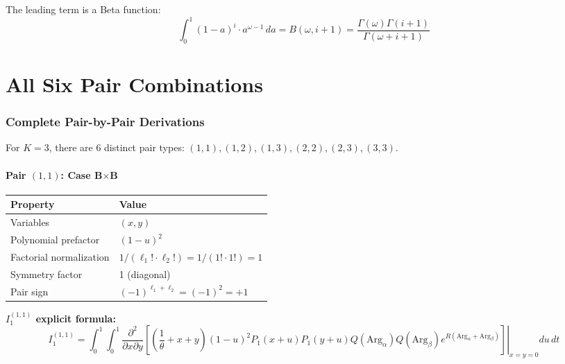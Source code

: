 \documentclass[11pt]{article}
\begin{document}
The leading term is a Beta function:
\begin{equation}
\int_0^1 (1-a)^i \cdot a^{\omega-1} \, da = B(\omega, i+1) = \frac{\Gamma(\omega)\Gamma(i+1)}{\Gamma(\omega+i+1)}
\end{equation}


\part{All Six Pair Combinations}

\section{Complete Pair-by-Pair Derivations}
\label{sec:pairs}

For $K=3$, there are 6 distinct pair types: $(1,1), (1,2), (1,3), (2,2), (2,3), (3,3)$.

\subsection{Pair $(1,1)$: Case B$\times$B}

\begin{center}
\begin{tabular}{ll}
\toprule
Property & Value \\
\midrule
Variables & $(x, y)$ \\
Polynomial prefactor & $(1-u)^2$ \\
Factorial normalization & $1/(\ell_1! \cdot \ell_2!) = 1/(1! \cdot 1!) = 1$ \\
Symmetry factor & 1 (diagonal) \\
Pair sign & $(-1)^{\ell_1+\ell_2} = (-1)^2 = +1$ \\
\bottomrule
\end{tabular}
\end{center}

\textbf{$I_1^{(1,1)}$ explicit formula:}
\begin{equation}
I_1^{(1,1)} = \int_0^1 \int_0^1 \left.\frac{\partial^2}{\partial x \partial y}\left[\left(\frac{1}{\theta} + x + y\right) (1-u)^2 P_1(x+u) P_1(y+u) Q(\text{Arg}_\alpha) Q(\text{Arg}_\beta) e^{R(\text{Arg}_\alpha + \text{Arg}_\beta)}\right]\right|_{x=y=0} du\, dt
\end{equation}
\end{document}
